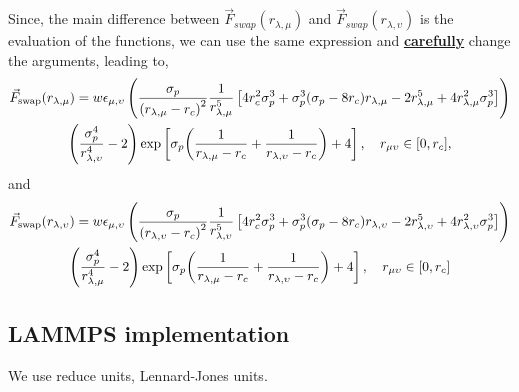 \documentclass[main.tex]{subfiles}
\begin{document}
Since, the main difference between $\vec{F}_{swap}(r_{\lambda,\mu})$ and $\vec{F}_{swap}(r_{\lambda,\upsilon})$ is the evaluation of the functions, we can use the same expression and \underline{\textbf{carefully}} change the arguments, leading to,
\begin{multline}
    \vec{F}_{\mathrm{swap}}(r_{\lambda,\mu}) =w\epsilon_{\mu,\upsilon}
                                                 \left(
                                                       \frac{\sigma_p}{\qty(r_{\lambda,\mu}-r_c)^2} 
                                                       \frac{1}{r_{\lambda,\mu}^5}\left[ 4r_c^2\sigma^3_p + \sigma^3_p\qty(\sigma_p-8r_c) r_{\lambda,\mu} -2r^5_{\lambda,\mu} + 4r^2_{\lambda,\mu} \sigma^3_p \right]
                                                \right)
                                                \\
                                                \left( \frac{\sigma_p^4}{r_{\lambda,\upsilon}^4}-2\right)
                                            \exp\left[\sigma_p\qty(\frac{1}{r_{\lambda,\mu}-r_c}+\frac{1}{r_{\lambda,\upsilon}-r_{c}})+4\right],\quad r_{\mu\upsilon}\in\qty[0,r_c],
\end{multline}
and
\begin{multline}
    \vec{F}_{\mathrm{swap}}(r_{\lambda,\upsilon}) =w\epsilon_{\mu,\upsilon}
                                                 \left(
                                                       \frac{\sigma_p}{\qty(r_{\lambda,\upsilon}-r_c)^2} 
                                                       \frac{1}{r_{\lambda,\upsilon}^5}\left[ 4r_c^2\sigma^3_p + \sigma^3_p\qty(\sigma_p-8r_c) r_{\lambda,\upsilon} -2r^5_{\lambda,\upsilon} + 4r^2_{\lambda,\upsilon} \sigma^3_p \right]
                                                \right)
                                                \\
                                                \left( \frac{\sigma_p^4}{r_{\lambda,\mu}^4}-2\right)
                                            \exp\left[\sigma_p\qty(\frac{1}{r_{\lambda,\mu}-r_c}+\frac{1}{r_{\lambda,\upsilon}-r_{c}})+4\right],\quad r_{\mu\upsilon}\in\qty[0,r_c]
\end{multline}

\subsection{LAMMPS implementation}

We use reduce units, Lennard-Jones units.
\end{document}
